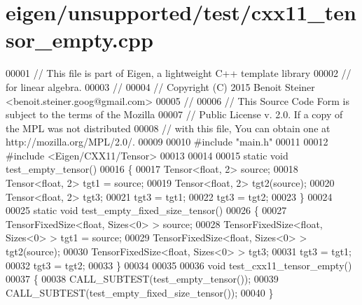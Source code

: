 \hypertarget{eigen_2unsupported_2test_2cxx11__tensor__empty_8cpp_source}{}\section{eigen/unsupported/test/cxx11\+\_\+tensor\+\_\+empty.cpp}
\label{eigen_2unsupported_2test_2cxx11__tensor__empty_8cpp_source}

\begin{DoxyCode}
00001 \textcolor{comment}{// This file is part of Eigen, a lightweight C++ template library}
00002 \textcolor{comment}{// for linear algebra.}
00003 \textcolor{comment}{//}
00004 \textcolor{comment}{// Copyright (C) 2015 Benoit Steiner <benoit.steiner.goog@gmail.com>}
00005 \textcolor{comment}{//}
00006 \textcolor{comment}{// This Source Code Form is subject to the terms of the Mozilla}
00007 \textcolor{comment}{// Public License v. 2.0. If a copy of the MPL was not distributed}
00008 \textcolor{comment}{// with this file, You can obtain one at http://mozilla.org/MPL/2.0/.}
00009 
00010 \textcolor{preprocessor}{#include "main.h"}
00011 
00012 \textcolor{preprocessor}{#include <Eigen/CXX11/Tensor>}
00013 
00014 
00015 \textcolor{keyword}{static} \textcolor{keywordtype}{void} test\_empty\_tensor()
00016 \{
00017   Tensor<float, 2> source;
00018   Tensor<float, 2> tgt1 = source;
00019   Tensor<float, 2> tgt2(source);
00020   Tensor<float, 2> tgt3;
00021   tgt3 = tgt1;
00022   tgt3 = tgt2;
00023 \}
00024 
00025 \textcolor{keyword}{static} \textcolor{keywordtype}{void} test\_empty\_fixed\_size\_tensor()
00026 \{
00027   TensorFixedSize<float, Sizes<0> > source;
00028   TensorFixedSize<float, Sizes<0> > tgt1 = source;
00029   TensorFixedSize<float, Sizes<0> > tgt2(source);
00030   TensorFixedSize<float, Sizes<0> > tgt3;
00031   tgt3 = tgt1;
00032   tgt3 = tgt2;
00033 \}
00034 
00035 
00036 \textcolor{keywordtype}{void} test\_cxx11\_tensor\_empty()
00037 \{
00038    CALL\_SUBTEST(test\_empty\_tensor());
00039    CALL\_SUBTEST(test\_empty\_fixed\_size\_tensor());
00040 \}
\end{DoxyCode}

